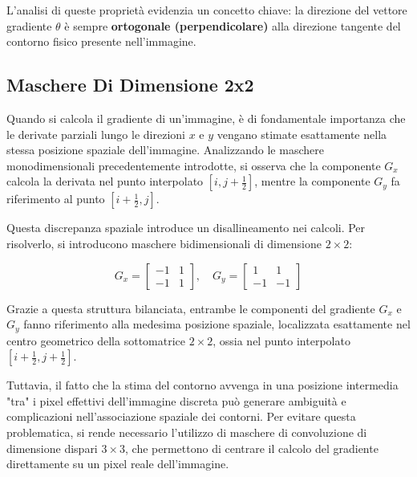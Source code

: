 ﻿\documentclass[11pt, a4paper]{article}
\begin{document}
L'analisi di queste proprietà evidenzia un concetto chiave: la direzione del vettore gradiente $\theta$ è sempre \textbf{ortogonale (perpendicolare)} alla direzione tangente del contorno fisico presente nell'immagine.


\subsection{Maschere Di Dimensione 2x2}

Quando si calcola il gradiente di un'immagine, è di fondamentale importanza che le derivate parziali lungo le direzioni $x$ e $y$ vengano stimate esattamente nella stessa posizione spaziale dell'immagine. Analizzando le maschere monodimensionali precedentemente introdotte, si osserva che la componente $G_x$ calcola la derivata nel punto interpolato $[i, j + \frac{1}{2}]$, mentre la componente $G_y$ fa riferimento al punto $[i + \frac{1}{2}, j]$.

Questa discrepanza spaziale introduce un disallineamento nei calcoli. Per risolverlo, si introducono maschere bidimensionali di dimensione $2 \times 2$:

\[ G_x = \begin{bmatrix} -1 & 1 \\ -1 & 1 \end{bmatrix}, \quad G_y = \begin{bmatrix} 1 & 1 \\ -1 & -1 \end{bmatrix} \]

Grazie a questa struttura bilanciata, entrambe le componenti del gradiente $G_x$ e $G_y$ fanno riferimento alla medesima posizione spaziale, localizzata esattamente nel centro geometrico della sottomatrice $2 \times 2$, ossia nel punto interpolato $[i + \frac{1}{2}, j + \frac{1}{2}]$.

Tuttavia, il fatto che la stima del contorno avvenga in una posizione intermedia "tra" i pixel effettivi dell'immagine discreta può generare ambiguità e complicazioni nell'associazione spaziale dei contorni. Per evitare questa problematica, si rende necessario l'utilizzo di maschere di convoluzione di dimensione dispari $3 \times 3$, che permettono di centrare il calcolo del gradiente direttamente su un pixel reale dell'immagine.
\end{document}
